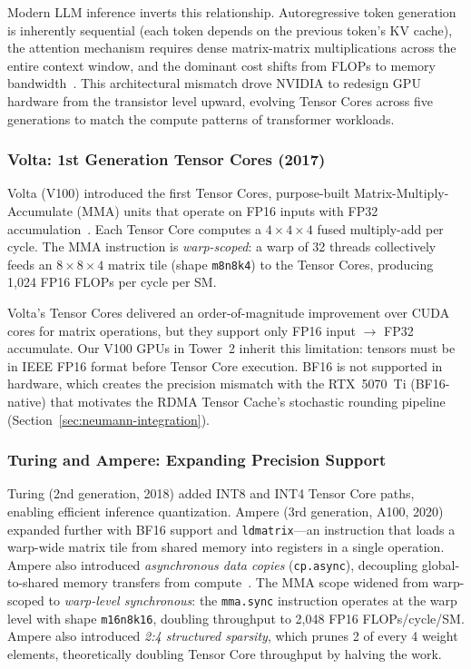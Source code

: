 \documentclass[11pt,letterpaper]{article}
\theoremstyle{definition}
\begin{document}
Modern LLM inference inverts this relationship. Autoregressive token generation is inherently sequential (each token depends on the previous token's KV cache), the attention mechanism requires dense matrix-matrix multiplications across the entire context window, and the dominant cost shifts from FLOPs to memory bandwidth~\cite{patel2025tensorcore}. This architectural mismatch drove NVIDIA to redesign GPU hardware from the transistor level upward, evolving Tensor Cores across five generations to match the compute patterns of transformer workloads.

\subsubsection{Volta: 1st Generation Tensor Cores (2017)}

Volta (V100) introduced the first Tensor Cores, purpose-built Matrix-Multiply-Accumulate (MMA) units that operate on FP16 inputs with FP32 accumulation~\cite{patel2025tensorcore}. Each Tensor Core computes a $4 \times 4 \times 4$ fused multiply-add per cycle. The MMA instruction is \emph{warp-scoped}: a warp of 32 threads collectively feeds an $8 \times 8 \times 4$ matrix tile (shape \texttt{m8n8k4}) to the Tensor Cores, producing 1,024 FP16 FLOPs per cycle per SM.

Volta's Tensor Cores delivered an order-of-magnitude improvement over CUDA cores for matrix operations, but they support only FP16 input $\to$ FP32 accumulate. Our V100 GPUs in Tower~2 inherit this limitation: tensors must be in IEEE FP16 format before Tensor Core execution. BF16 is not supported in hardware, which creates the precision mismatch with the RTX~5070~Ti (BF16-native) that motivates the RDMA Tensor Cache's stochastic rounding pipeline (Section~\ref{sec:neumann-integration}).

\subsubsection{Turing and Ampere: Expanding Precision Support}

Turing (2nd generation, 2018) added INT8 and INT4 Tensor Core paths, enabling efficient inference quantization. Ampere (3rd generation, A100, 2020) expanded further with BF16 support and \texttt{ldmatrix}---an instruction that loads a warp-wide matrix tile from shared memory into registers in a single operation. Ampere also introduced \emph{asynchronous data copies} (\texttt{cp.async}), decoupling global-to-shared memory transfers from compute~\cite{patel2025tensorcore}. The MMA scope widened from warp-scoped to \emph{warp-level synchronous}: the \texttt{mma.sync} instruction operates at the warp level with shape \texttt{m16n8k16}, doubling throughput to 2,048 FP16 FLOPs/cycle/SM. Ampere also introduced \emph{2:4 structured sparsity}, which prunes 2 of every 4 weight elements, theoretically doubling Tensor Core throughput by halving the work.
\end{document}
